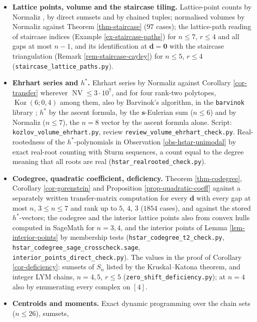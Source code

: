 \documentclass[11pt, a4paper, abstract=yes]{scrartcl}
\theoremstyle{definition}
\theoremstyle{remark}
\theoremstyle{plain}
\newcommand{\vek}[1]{\boldsymbol{#1}}
\theoremstyle{remark}
\theoremstyle{plain}
\newcommand{\Koz}{\operatorname{Koz}}
\newcommand{\NV}{\operatorname{NV}}
\let\autocite\cite
\begin{document}
\begin{itemize}
\item \textbf{Lattice points, volume and the staircase tiling.} Lattice-point counts by Normaliz
\autocite{BrunsIchim2010}, by direct sumsets and by chained tuples; normalised volumes by Normaliz
against Theorem \ref{thm-staircase} (\(97\) cases); the lattice-path reading of staircase indices
(Example \ref{ex-staircase-paths}) for \(n\le7\), \(r\le4\) and all gaps at most \(n-1\), and its
identification at \(\vek d=\vek 0\) with the staircase triangulation (Remark
\ref{rem-staircase-cayley}) for \(n\le5\), \(r\le4\) (\texttt{staircase\_lattice\_paths.py}).
\item \textbf{Ehrhart series and \(h^{\ast}\).} Ehrhart series by Normaliz against Corollary \ref{cor-transfer}
wherever \(\NV\le3\cdot10^7\), and for four rank-two polytopes, \(\Koz(6;0,4)\) among them, also by
Barvinok's algorithm, in the \texttt{barvinok} library \autocite{Verdoolaege2007}; \(h^*\) by the ascent
formula, by the \(\vek s\)-Eulerian sum (\(n\le6\)) and by Normaliz (\(n\le7\)), the \(n=8\) vector by
the ascent formula alone. Script: \texttt{kozlov\_volume\_ehrhart.py}, review
\texttt{review\_volume\_ehrhart\_check.py}. Real-rootedness of the \(h^*\)-polynomials in
Observation \ref{obs-hstar-unimodal} by exact real-root counting with Sturm sequences, a count equal
to the degree meaning that all roots are real (\texttt{hstar\_realrooted\_check.py}).
\item \textbf{Codegree, quadratic coefficient, deficiency.}
Theorem \ref{thm-codegree}, Corollary \ref{cor-gorenstein} and Proposition \ref{prop-quadratic-coeff} against a
separately written transfer-matrix computation for every \(\vek d\) with every gap at most \(n\),
\(3\le n\le7\) and rank up to \(5\), \(4\), \(3\) (\(1854\) cases), and against the stored \(h^*\)-vectors; the
codegree and the interior lattice points also from convex hulls computed in SageMath for \(n=3,4\),
and the interior points of Lemma \ref{lem-interior-points} by membership tests
(\texttt{hstar\_codegree\_t2\_check.py}, \texttt{hstar\_codegree\_sage\_crosscheck.sage},
\texttt{interior\_points\_direct\_check.py}). The values in the proof of Corollary \ref{cor-deficiency}: sumsets of
\(S_n\) listed by the Kruskal--Katona theorem, and integer LYM chains, \(n=4,5\), \(r\le5\)
(\texttt{zero\_shift\_deficiency.py}); at \(n=4\) also by enumerating every complex on \([4]\).
\item \textbf{Centroids and moments.} Exact dynamic programming over the chain sets (\(n\le26\)), sumsets,

\end{itemize}
\end{document}
